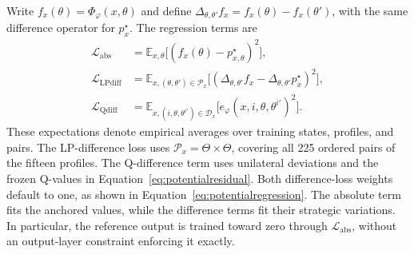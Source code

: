 \documentclass[pmlr]{jmlr}
\begin{document}
Write $f_x(\theta)=\Phi_\varphi(x,\theta)$ and define $\Delta_{\theta,\theta'} f_x=f_x(\theta)-f_x(\theta')$, with the same difference operator for $p_x^\star$. The regression terms are
\begin{equation}
\begin{aligned}
 \mathcal L_{\mathrm{abs}}
 &=\mathbb E_{x,\theta}\big[(f_x(\theta)-p_{x,\theta}^\star)^2\big],\\
 \mathcal L_{\mathrm{LPdiff}}
 &=\mathbb E_{x,(\theta,\theta')\in\mathcal P_x}
   \big[(\Delta_{\theta,\theta'} f_x-\Delta_{\theta,\theta'}p_x^\star)^2\big],\\
 \mathcal L_{\mathrm{Qdiff}}
 &=\mathbb E_{x,(i,\theta,\theta^{i\prime})\in\mathcal D_x}
   \big[e_\varphi(x,i,\theta,\theta^{i\prime})^2\big].
\end{aligned}
 \label{eq:potentiallosses}
\end{equation}
These expectations denote empirical averages over training states, profiles, and pairs. The LP-difference loss uses $\mathcal P_x=\Theta\times\Theta$, covering all 225 ordered pairs of the fifteen profiles. The Q-difference term uses unilateral deviations and the frozen Q-values in Equation~\eqref{eq:potentialresidual}. Both difference-loss weights default to one, as shown in Equation~\eqref{eq:potentialregression}. The absolute term fits the anchored values, while the difference terms fit their strategic variations. In particular, the reference output is trained toward zero through $\mathcal L_{\mathrm{abs}}$, without an output-layer constraint enforcing it exactly.
\end{document}
